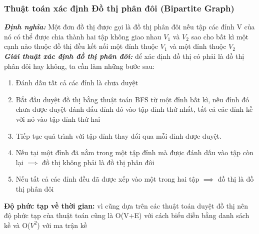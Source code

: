 \documentclass[a4paper]{article}
\begin{document}
        \subsubsection{Thuật toán xác định Đồ thị phân đôi (Bipartite Graph)}
\textit{\textbf{Định nghĩa:}} Một đơn đồ thị được gọi là đồ thị phân đôi nếu tập các đỉnh V của nó có thể được chia thành hai tập không giao nhau $V_1$ và $V_2$ sao cho bất kì một cạnh nào thuộc đồ thị đều kết nối một đỉnh thuộc $V_1$ và một đỉnh thuộc $V_2$ \\
\textit{\textbf{Giải thuật xác định đồ thị phân đôi:}} để xác định đồ thị có phải là đồ thị phân đôi hay không, ta cần làm những bước sau:
\begin{enumerate}
    \item Đánh dấu tất cả các đỉnh là chưa duyệt 
    \item Bắt đầu duyệt đồ thị bằng thuật toán BFS từ một đỉnh bất kì, nếu đỉnh đó chưa được duyệt đánh dấu đỉnh đó vào tập đỉnh thứ nhất, tất cả các đỉnh kề với nó vào tập đỉnh thứ hai
    \item Tiếp tục quá trình với tập đỉnh thay đổi qua mỗi đỉnh được duyệt.
    \item Nếu tại một đỉnh đã nằm trong một tập đỉnh mà được đánh dấu vào tập còn lại $\implies$ đồ thị không phải là đồ thị phân đôi
    \item Nếu tất cả các đỉnh đều đã được xếp vào một trong hai tập $\implies$ đồ thị là đồ thị phân đôi
\end{enumerate}
\textbf{Độ phức tạp về thời gian:} vì cũng dựa trên các thuật toán duyệt đồ thị nên độ phức tạp của thuật toán cũng là O(V+E) với cách biểu diễn bằng danh sách kề và O($V^2$) với ma trận kề \\
\end{document}
